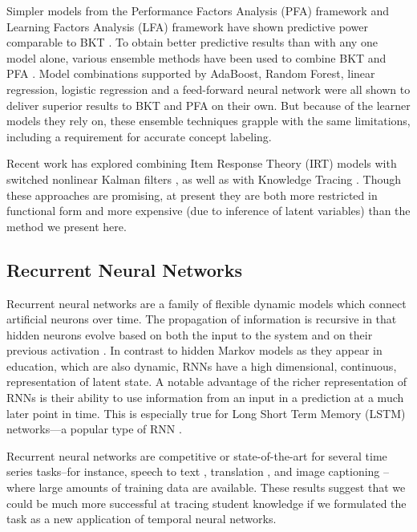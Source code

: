 Simpler models from the Performance Factors Analysis (PFA) framework \cite{pavlik2009performance} and Learning Factors Analysis (LFA) framework \cite{cen2006learning} have shown predictive power comparable to BKT \cite{gong2010comparing}. 
To obtain better predictive results than with any one model alone, various ensemble methods have been used to combine BKT and PFA \cite{d2011ensembling}. Model combinations supported by AdaBoost, Random Forest, linear regression, logistic regression and a feed-forward neural network were all shown to deliver superior results to BKT and PFA on their own. But because of the learner models they rely on, these ensemble techniques grapple with the same limitations, including a requirement for accurate concept labeling.

Recent work has explored combining Item Response Theory (IRT) models with switched nonlinear Kalman filters %
\cite{lan2014time}, as well as with Knowledge Tracing \cite{khajah2014integrating,khajah2014incorporating}. 
Though these approaches are promising, at present they are both more restricted in functional form and more expensive (due to inference of latent variables) than the method we present here.

\subsection{Recurrent Neural Networks}

Recurrent neural networks are a family of flexible dynamic models which connect artificial neurons over time. The propagation of information is recursive in that hidden neurons evolve based on both the input to the system and on their previous activation \cite{williams1989learning}. 
In contrast to hidden Markov models as they appear in education, which are also dynamic, RNNs have a high dimensional, continuous, representation of latent state. A notable advantage of the richer representation of RNNs is their ability to use information from an input in a prediction at a much later point in time. This is especially true for Long Short Term Memory (LSTM) networks---a popular type of RNN \cite{hochreiter1997long}.

Recurrent neural networks 
are competitive or state-of-the-art for several 
time series tasks--for instance, speech to text \cite{graves2013speech}, translation \cite{mikolov2010recurrent}, and image captioning \cite{karpathy2014deep}--where large amounts of training data are available. These results suggest that we could be much more successful at tracing student knowledge if we formulated the task as a new application of temporal neural networks.


